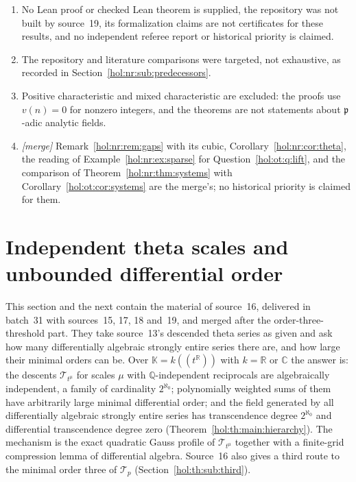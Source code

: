 \documentclass[11pt]{article}
\numberwithin{equation}{section}
\theoremstyle{definition}
\theoremstyle{remark}
\newcommand{\C}{\mathbb C}
\newcommand{\R}{\mathbb R}
\newcommand{\Q}{\mathbb Q}
\newcommand{\KK}{\mathbb K}
\begin{document}
\begin{enumerate}[label=\textup{(R\arabic*)}]
\item No Lean proof or checked Lean theorem is supplied, the repository was not
built by source~19, its formalization claims are not certificates for these
results, and no independent referee report or historical priority is claimed.
\item The repository and literature comparisons were targeted, not exhaustive,
as recorded in Section~\ref{hol:nr:sub:predecessors}.
\item Positive characteristic and mixed characteristic are excluded: the
proofs use $v(n)=0$ for nonzero integers, and the theorems are not statements
about $\mathfrak p$-adic analytic fields.
\item \emph{[merge]} Remark~\ref{hol:nr:rem:gaps} with its cubic,
Corollary~\ref{hol:nr:cor:theta}, the reading of
Example~\ref{hol:nr:ex:sparse} for Question~\ref{hol:ot:q:lift}, and the
comparison of Theorem~\ref{hol:nr:thm:systems} with
Corollary~\ref{hol:ot:cor:systems} are the merge's; no historical priority is
claimed for them.
\end{enumerate}

\section{Independent theta scales and unbounded differential order}
\label{hol:th:sec:setting}

This section and the next contain the material of source~16, delivered in
batch~31 with sources~15, 17, 18 and~19, and merged after the order-three-threshold part. They
take source~13's descended theta series as given and ask how many
differentially algebraic strongly entire series there are, and how large
their minimal orders can be. Over $\KK=k((t^\R))$ with $k=\R$ or $\C$ the
answer is: the descents $\mathcal T_{t^\mu}$ for scales $\mu$ with
$\Q$-independent reciprocals are algebraically independent, a family of
cardinality $2^{\aleph_0}$; polynomially weighted sums of them have
arbitrarily large minimal differential order; and the field generated by all
differentially algebraic strongly entire series has transcendence degree
$2^{\aleph_0}$ and differential transcendence degree zero
(Theorem~\ref{hol:th:main:hierarchy}). The mechanism is the exact quadratic
Gauss profile of $\mathcal T_{t^\mu}$ together with a finite-grid compression
lemma of differential algebra. Source~16 also gives a third route to the
minimal order three of $\mathcal T_p$ (Section~\ref{hol:th:sub:third}).
\end{document}
